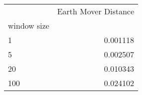 \begin{tabular}{lr}
\toprule
{} &  Earth Mover Distance \\
window size &                       \\
\midrule
1           &              0.001118 \\
5           &              0.002507 \\
20          &              0.010343 \\
100         &              0.024102 \\
\bottomrule
\end{tabular}
